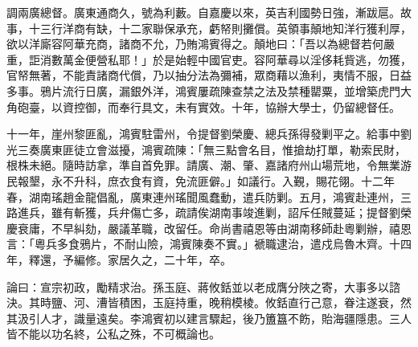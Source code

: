 \begin{pinyinscope}
調兩廣總督。廣東通商久，號為利藪。自嘉慶以來，英吉利國勢日強，漸跋扈。故事，十三行洋商有缺，十二家聯保承充，虧帑則攤償。英領事顛地知洋行獲利厚，欲以洋廝容阿華充商，諸商不允，乃賄鴻賓得之。顛地曰：「吾以為總督若何嚴重，詎消數萬金便營私耶！」於是始輕中國官吏。容阿華尋以淫侈耗貲逃，勿獲，官帑無著，不能責諸商代償，乃以抽分法為彌補，眾商藉以漁利，夷情不服，日益多事。鴉片流行日廣，漏銀外洋，鴻賓屢疏陳查禁之法及禁種罌粟，並增築虎門大角砲臺，以資控御，而奉行具文，未有實效。十年，協辦大學士，仍留總督任。

十一年，崖州黎匪亂，鴻賓駐雷州，令提督劉榮慶、總兵孫得發剿平之。給事中劉光三奏廣東匪徒立會滋擾，鴻賓疏陳：「無三點會名目，惟搶劫打單，勒索民財，根株未絕。隨時訪拿，準自首免罪。請廣、潮、肇、嘉諸府州山場荒地，令無業游民報墾，永不升科，庶衣食有資，免流匪僻。」如議行。入覲，賜花翎。十二年春，湖南瑤趙金龍倡亂，廣東連州瑤聞風蠢動，遣兵防剿。五月，鴻賓赴連州，三路進兵，雖有斬獲，兵弁傷亡多，疏請俟湖南事竣進剿，詔斥任賊蔓延；提督劉榮慶衰庸，不早糾劾，嚴議革職，改留任。命尚書禧恩等由湖南移師赴粵剿辦，禧恩言：「粵兵多食鴉片，不耐山險，鴻賓陳奏不實。」褫職逮治，遣戍烏魯木齊。十四年，釋還，予編修。家居久之，二十年，卒。

論曰：宣宗初政，勵精求治。孫玉庭、蔣攸銛並以老成膺分陜之寄，大事多以諮決。其時鹽、河、漕皆積困，玉庭持重，晚稍模棱。攸銛直行己意，眷注遂衰，然其汲引人才，識量遠矣。李鴻賓初以建言驟起，後乃簠簋不飭，貽海疆隱患。三人皆不能以功名終，公私之殊，不可概論也。


\end{pinyinscope}